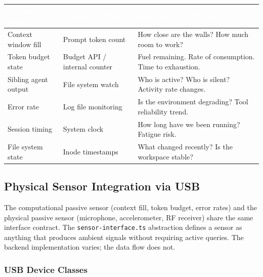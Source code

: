 \documentclass[11pt,letterpaper]{article}
\newcommand{\tableheader}[1]{\textbf{\sffamily\textcolor{white}{#1}}}
\begin{document}
\begin{center}
\begin{tabularx}{\textwidth}{L{3.5cm}L{3cm}X}
\toprule
{}
\tableheader{Ambient Signal} & \tableheader{Sensing Method} & \tableheader{Information Extracted} \\
\midrule
Context window fill & Prompt token count & How close are the walls? How much room to work? \\
Token budget state & Budget API / internal counter & Fuel remaining. Rate of consumption. Time to exhaustion. \\
Sibling agent output & File system watch & Who is active? Who is silent? Activity rate changes. \\
Error rate & Log file monitoring & Is the environment degrading? Tool reliability trend. \\
Session timing & System clock & How long have we been running? Fatigue risk. \\
File system state & Inode timestamps & What changed recently? Is the workspace stable? \\
\bottomrule
\end{tabularx}
\end{center}

\subsection{Physical Sensor Integration via USB}

The computational passive sensor (context fill, token budget, error rates) and the physical passive sensor (microphone, accelerometer, RF receiver) share the same interface contract. The \texttt{sensor-interface.ts} abstraction defines a sensor as anything that produces ambient signals without requiring active queries. The backend implementation varies; the data flow does not.

\subsubsection{USB Device Classes}
\end{document}

